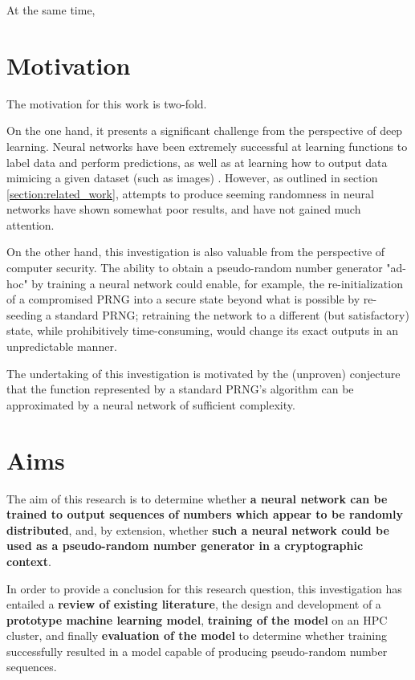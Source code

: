 \documentclass[12pt, titlepage]{report}
\theoremstyle{definition}
\begin{document}
At the same time, 



\section{Motivation}
The motivation for this work is two-fold. 

On the one hand, it presents a significant challenge from the perspective of deep learning. Neural networks have been extremely successful at learning functions to label data and perform predictions, as well as at learning how to output data mimicing a given dataset (such as images) \cite{goodfellow2014generative}. However, as outlined in section \ref{section:related_work}, attempts to produce seeming randomness in neural networks have shown somewhat poor results, and have not gained much attention.

On the other hand, this investigation is also valuable from the perspective of computer security. The ability to obtain a pseudo-random number generator "ad-hoc" by training a neural network could enable, for example, the re-initialization of a compromised PRNG into a secure state beyond what is possible by re-seeding a standard PRNG; retraining the network to a different (but satisfactory) state, while prohibitively time-consuming, would change its exact outputs in an unpredictable manner.

The undertaking of this investigation is motivated by the (unproven) conjecture that the function represented by a standard PRNG's algorithm can be approximated by a neural network of sufficient complexity.


\section{Aims}\label{subsection:aims}
The aim of this research is to determine whether \textbf{a neural network can be trained to output sequences of numbers which appear to be randomly distributed}, and, by extension, whether \textbf{such a neural network could be used as a pseudo-random number generator in a cryptographic context}.

In order to provide a conclusion for this research question, this investigation has entailed a \textbf{review of existing literature}, the design and development of a \textbf{prototype machine learning model}, \textbf{training of the model} on an HPC cluster, and finally \textbf{evaluation of the model} to determine whether training successfully resulted in a model capable of producing pseudo-random number sequences.
\end{document}
